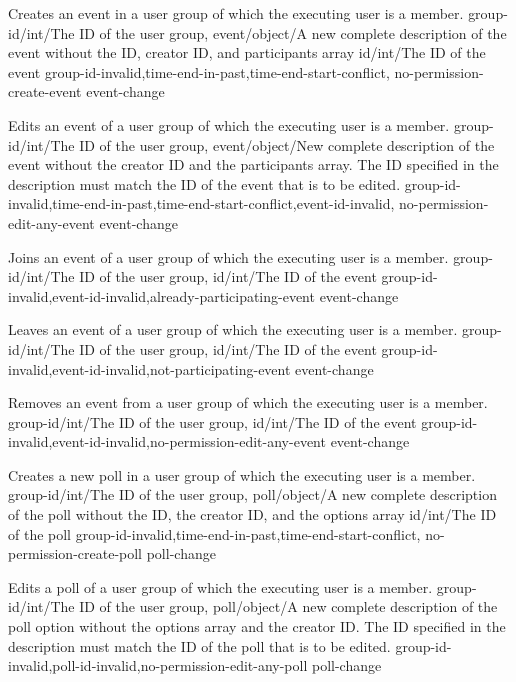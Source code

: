 \documentclass[parskip=full,11pt]{scrartcl}
\begin{document}
{Creates an event in a user group of which the executing user is a member.}
{group-id/int/The ID of the user group,
event/object/A new complete description of the event
without the ID{,} creator ID{,} and participants array}
{id/int/The ID of the event}
{group-id-invalid,time-end-in-past,time-end-start-conflict,
no-permission-create-event}
{event-change}

{Edits an event of a user group of which the executing user is a member.}
{group-id/int/The ID of the user group,
event/object/New complete description of the event without the creator ID and
the participants array.
The ID specified in the description must match the ID of the event that
is to be edited.}
{}
{group-id-invalid,time-end-in-past,time-end-start-conflict,event-id-invalid,
no-permission-edit-any-event}
{event-change}

{Joins an event of a user group of which the executing user is a member.}
{group-id/int/The ID of the user group,
id/int/The ID of the event}
{}
{group-id-invalid,event-id-invalid,already-participating-event}
{event-change}

{Leaves an event of a user group of which the executing user is a member.}
{group-id/int/The ID of the user group,
id/int/The ID of the event}
{}
{group-id-invalid,event-id-invalid,not-participating-event}
{event-change}

{Removes an event from a user group of which the executing user is a member.}
{group-id/int/The ID of the user group,
id/int/The ID of the event}
{}
{group-id-invalid,event-id-invalid,no-permission-edit-any-event}
{event-change}

{Creates a new poll in a user group of which the executing user is a member.}
{group-id/int/The ID of the user group,
poll/object/A new complete description of the poll without the ID, the
creator ID, and the options array}
{id/int/The ID of the poll}
{group-id-invalid,time-end-in-past,time-end-start-conflict,
no-permission-create-poll}
{poll-change}

{Edits a poll of a user group of which the executing user is a member.}
{group-id/int/The ID of the user group,
poll/object/A new complete description of the poll option without
the options array and the creator ID.
The ID specified in the description must match the ID of the poll that
is to be edited.}
{}
{group-id-invalid,poll-id-invalid,no-permission-edit-any-poll}
{poll-change}
\end{document}

